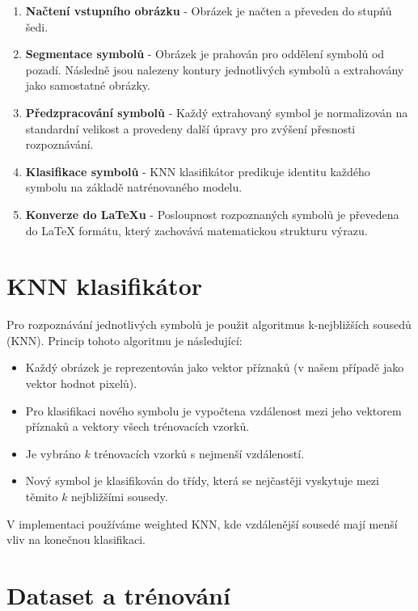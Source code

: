 \begin{enumerate}
    \item \textbf{Načtení vstupního obrázku} - Obrázek je načten a převeden do stupňů šedi.
    
    \item \textbf{Segmentace symbolů} - Obrázek je prahován pro oddělení symbolů od pozadí. Následně jsou nalezeny kontury jednotlivých symbolů a extrahovány jako samostatné obrázky.
    
    \item \textbf{Předzpracování symbolů} - Každý extrahovaný symbol je normalizován na standardní velikost a provedeny další úpravy pro zvýšení přesnosti rozpoznávání.
    
    \item \textbf{Klasifikace symbolů} - KNN klasifikátor predikuje identitu každého symbolu na základě natrénovaného modelu.
    
    \item \textbf{Konverze do LaTeXu} - Posloupnost rozpoznaných symbolů je převedena do LaTeX formátu, který zachovává matematickou strukturu výrazu.
\end{enumerate}

\section{KNN klasifikátor}

Pro rozpoznávání jednotlivých symbolů je použit algoritmus k-nejbližších sousedů (KNN). Princip tohoto algoritmu je následující:

\begin{itemize}
    \item Každý obrázek je reprezentován jako vektor příznaků (v našem případě jako vektor hodnot pixelů).
    \item Pro klasifikaci nového symbolu je vypočtena vzdálenost mezi jeho vektorem příznaků a vektory všech trénovacích vzorků.
    \item Je vybráno $k$ trénovacích vzorků s nejmenší vzdáleností.
    \item Nový symbol je klasifikován do třídy, která se nejčastěji vyskytuje mezi těmito $k$ nejbližšími sousedy.
\end{itemize}

V implementaci používáme weighted KNN, kde vzdálenější sousedé mají menší vliv na konečnou klasifikaci.

\section{Dataset a trénování}

